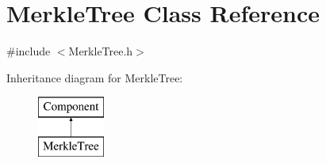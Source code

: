 \hypertarget{classMerkleTree}{}\section{Merkle\+Tree Class Reference}
\label{classMerkleTree}


{\ttfamily \#include $<$Merkle\+Tree.\+h$>$}

Inheritance diagram for Merkle\+Tree\+:\begin{figure}[H]
\begin{center}
\leavevmode
\includegraphics[height=2.000000cm]{classMerkleTree}
\end{center}
\end{figure}
